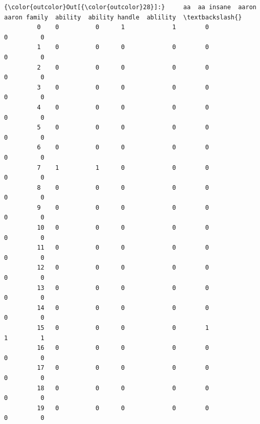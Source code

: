 \documentclass[11pt]{article}
\begin{document}
\begin{Verbatim}[commandchars=\\\{\}]
{\color{outcolor}Out[{\color{outcolor}28}]:}     aa  aa insane  aaron  aaron family  ability  ability handle  ablility  \textbackslash{}
         0    0          0      1             1        0               0         0   
         1    0          0      0             0        0               0         0   
         2    0          0      0             0        0               0         0   
         3    0          0      0             0        0               0         0   
         4    0          0      0             0        0               0         0   
         5    0          0      0             0        0               0         0   
         6    0          0      0             0        0               0         0   
         7    1          1      0             0        0               0         0   
         8    0          0      0             0        0               0         0   
         9    0          0      0             0        0               0         0   
         10   0          0      0             0        0               0         0   
         11   0          0      0             0        0               0         0   
         12   0          0      0             0        0               0         0   
         13   0          0      0             0        0               0         0   
         14   0          0      0             0        0               0         0   
         15   0          0      0             0        1               1         1   
         16   0          0      0             0        0               0         0   
         17   0          0      0             0        0               0         0   
         18   0          0      0             0        0               0         0   
         19   0          0      0             0        0               0         0   
         

\end{Verbatim}
\end{document}
